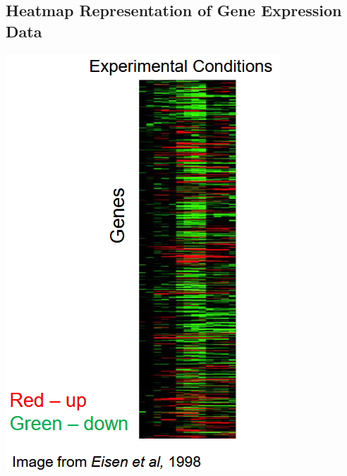 \documentclass[10pt]{article}
\begin{document}
\subsection*{Heatmap Representation of Gene Expression Data}
\begin{center}
    \includegraphics[scale=0.6]{W6_4.png}
\end{center}
\end{document}
